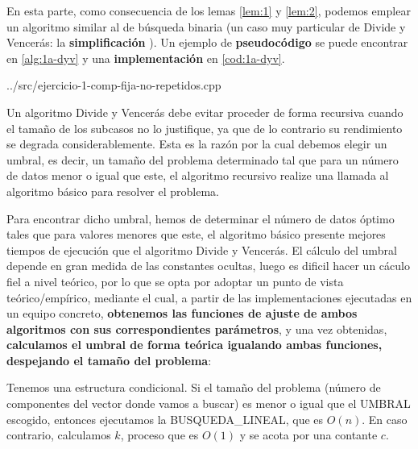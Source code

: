 En esta parte, como consecuencia de los lemas \ref{lem:1} y \ref{lem:2}, podemos emplear un 
algoritmo similar al de búsqueda binaria (un caso muy particular de Divide y Vencerás: la
\textbf{simplificación} \cite{Verdegay2017}). Un ejemplo de \textbf{pseudocódigo} se puede encontrar en \ref{alg:1a-dyv} y
una \textbf{implementación} en \ref{cod:1a-dyv}.






{../src/ejercicio-1-comp-fija-no-repetidos.cpp} 


Un algoritmo Divide y Vencerás debe evitar proceder de forma recursiva cuando el tamaño de los subcasos no lo justifique, ya que
de lo contrario su rendimiento se degrada considerablemente. Esta es la razón por la cual debemos elegir un umbral, es decir, 
un tamaño del problema determinado tal que para un número de datos menor o igual que este, el algoritmo recursivo realize una 
llamada al algoritmo básico para resolver el problema. 

Para encontrar dicho umbral, hemos de determinar el número de datos óptimo tales que para valores menores que este, el algoritmo básico 
presente mejores tiempos de ejecución que el algoritmo Divide y Vencerás. El cálculo del umbral depende en gran medida de las constantes ocultas, 
luego es dificil hacer un cáculo fiel a nivel teórico, por lo que se opta por adoptar un punto de vista teórico/empírico, mediante el cual, a partir de las 
implementaciones ejecutadas en un equipo concreto, \textbf{obtenemos las funciones de ajuste de ambos algoritmos con sus correspondientes 
parámetros}, y una vez obtenidas, \textbf{calculamos el umbral de forma teórica igualando ambas funciones, despejando el tamaño del problema}: 




Tenemos una estructura condicional. Si el tamaño del problema (número de componentes del vector donde 
vamos a buscar) es menor o igual que el UMBRAL escogido, entonces ejecutamos la BUSQUEDA\_LINEAL, que es $O(n)$. 
En caso contrario, calculamos $k$, proceso que es $O(1)$ y se acota por una contante $c$. 

